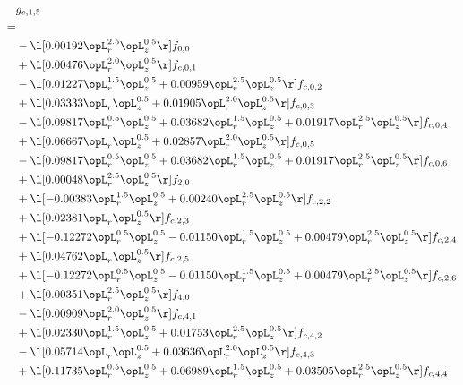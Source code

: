 \begin{alignat}{2} 
\label{eq:g_15_0} 
& g_{c,1,5} \nonumber \\ 
 = \\ 
& - \l[  0.00192 \opL_r^{2.5} \opL_z^{0.5}  \r] f_{0,0} \nonumber \\ 
& + \l[  0.00476 \opL_r^{2.0} \opL_z^{0.5}  \r] f_{c,0,1} \nonumber \\ 
& - \l[  0.01227 \opL_r^{1.5} \opL_z^{0.5} +  0.00959 \opL_r^{2.5} \opL_z^{0.5}  \r] f_{c,0,2} \nonumber \\ 
& + \l[  0.03333 \opL_r \opL_z^{0.5} +  0.01905 \opL_r^{2.0} \opL_z^{0.5}  \r] f_{c,0,3} \nonumber \\ 
& - \l[  0.09817 \opL_r^{0.5} \opL_z^{0.5} +  0.03682 \opL_r^{1.5} \opL_z^{0.5} +  0.01917 \opL_r^{2.5} \opL_z^{0.5}  \r] f_{c,0,4} \nonumber \\ 
& + \l[  0.06667 \opL_r \opL_z^{0.5} +  0.02857 \opL_r^{2.0} \opL_z^{0.5}  \r] f_{c,0,5} \nonumber \\ 
& - \l[  0.09817 \opL_r^{0.5} \opL_z^{0.5} +  0.03682 \opL_r^{1.5} \opL_z^{0.5} +  0.01917 \opL_r^{2.5} \opL_z^{0.5}  \r] f_{c,0,6} \nonumber \\ 
& + \l[  0.00048 \opL_r^{2.5} \opL_z^{0.5}  \r] f_{2,0} \nonumber \\ 
& + \l[  -0.00383 \opL_r^{1.5} \opL_z^{0.5} +  0.00240 \opL_r^{2.5} \opL_z^{0.5}  \r] f_{c,2,2} \nonumber \\ 
& + \l[  0.02381 \opL_r \opL_z^{0.5}  \r] f_{c,2,3} \nonumber \\ 
& + \l[  -0.12272 \opL_r^{0.5} \opL_z^{0.5}   -0.01150 \opL_r^{1.5} \opL_z^{0.5} +  0.00479 \opL_r^{2.5} \opL_z^{0.5}  \r] f_{c,2,4} \nonumber \\ 
& + \l[  0.04762 \opL_r \opL_z^{0.5}  \r] f_{c,2,5} \nonumber \\ 
& + \l[  -0.12272 \opL_r^{0.5} \opL_z^{0.5}   -0.01150 \opL_r^{1.5} \opL_z^{0.5} +  0.00479 \opL_r^{2.5} \opL_z^{0.5}  \r] f_{c,2,6} \nonumber \\ 
& + \l[  0.00351 \opL_r^{2.5} \opL_z^{0.5}  \r] f_{4,0} \nonumber \\ 
& - \l[  0.00909 \opL_r^{2.0} \opL_z^{0.5}  \r] f_{c,4,1} \nonumber \\ 
& + \l[  0.02330 \opL_r^{1.5} \opL_z^{0.5} +  0.01753 \opL_r^{2.5} \opL_z^{0.5}  \r] f_{c,4,2} \nonumber \\ 
& - \l[  0.05714 \opL_r \opL_z^{0.5} +  0.03636 \opL_r^{2.0} \opL_z^{0.5}  \r] f_{c,4,3} \nonumber \\ 
& + \l[  0.11735 \opL_r^{0.5} \opL_z^{0.5} +  0.06989 \opL_r^{1.5} \opL_z^{0.5} +  0.03505 \opL_r^{2.5} \opL_z^{0.5}  \r] f_{c,4,4} \nonumber \\ 

\end{alignat}

